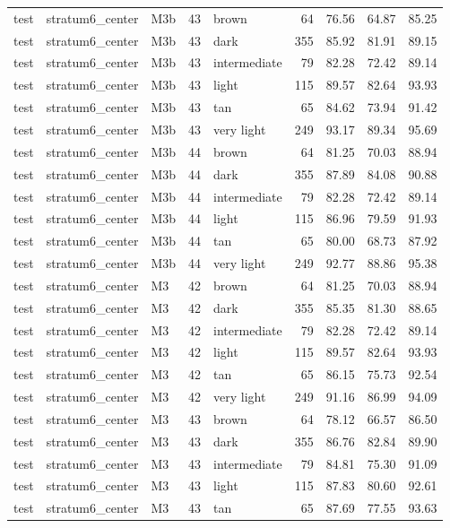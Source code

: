 \begin{tabular}{lllrlrrrr}
test & stratum6\_center & M3b & 43 & brown & 64 & 76.56 & 64.87 & 85.25 \\
test & stratum6\_center & M3b & 43 & dark & 355 & 85.92 & 81.91 & 89.15 \\
test & stratum6\_center & M3b & 43 & intermediate & 79 & 82.28 & 72.42 & 89.14 \\
test & stratum6\_center & M3b & 43 & light & 115 & 89.57 & 82.64 & 93.93 \\
test & stratum6\_center & M3b & 43 & tan & 65 & 84.62 & 73.94 & 91.42 \\
test & stratum6\_center & M3b & 43 & very light & 249 & 93.17 & 89.34 & 95.69 \\
test & stratum6\_center & M3b & 44 & brown & 64 & 81.25 & 70.03 & 88.94 \\
test & stratum6\_center & M3b & 44 & dark & 355 & 87.89 & 84.08 & 90.88 \\
test & stratum6\_center & M3b & 44 & intermediate & 79 & 82.28 & 72.42 & 89.14 \\
test & stratum6\_center & M3b & 44 & light & 115 & 86.96 & 79.59 & 91.93 \\
test & stratum6\_center & M3b & 44 & tan & 65 & 80.00 & 68.73 & 87.92 \\
test & stratum6\_center & M3b & 44 & very light & 249 & 92.77 & 88.86 & 95.38 \\
test & stratum6\_center & M3 & 42 & brown & 64 & 81.25 & 70.03 & 88.94 \\
test & stratum6\_center & M3 & 42 & dark & 355 & 85.35 & 81.30 & 88.65 \\
test & stratum6\_center & M3 & 42 & intermediate & 79 & 82.28 & 72.42 & 89.14 \\
test & stratum6\_center & M3 & 42 & light & 115 & 89.57 & 82.64 & 93.93 \\
test & stratum6\_center & M3 & 42 & tan & 65 & 86.15 & 75.73 & 92.54 \\
test & stratum6\_center & M3 & 42 & very light & 249 & 91.16 & 86.99 & 94.09 \\
test & stratum6\_center & M3 & 43 & brown & 64 & 78.12 & 66.57 & 86.50 \\
test & stratum6\_center & M3 & 43 & dark & 355 & 86.76 & 82.84 & 89.90 \\
test & stratum6\_center & M3 & 43 & intermediate & 79 & 84.81 & 75.30 & 91.09 \\
test & stratum6\_center & M3 & 43 & light & 115 & 87.83 & 80.60 & 92.61 \\
test & stratum6\_center & M3 & 43 & tan & 65 & 87.69 & 77.55 & 93.63 \\

\end{tabular}
